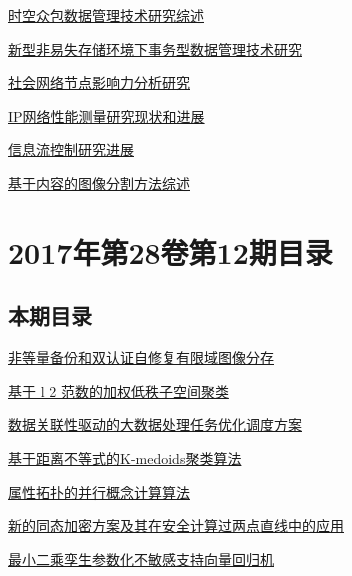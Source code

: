 \documentclass[a4paper]{article}
\begin{document}
\href{http://www.jos.org.cn/ch/reader/create_pdf.aspx?file_no=5140&year_id=2017&quarter_id=1&falg=1}{时空众包数据管理技术研究综述}

\href{http://www.jos.org.cn/ch/reader/create_pdf.aspx?file_no=5141&year_id=2017&quarter_id=1&falg=1}{新型非易失存储环境下事务型数据管理技术研究}

\href{http://www.jos.org.cn/ch/reader/create_pdf.aspx?file_no=5115&year_id=2017&quarter_id=1&falg=1}{社会网络节点影响力分析研究}

\href{http://www.jos.org.cn/ch/reader/create_pdf.aspx?file_no=5127&year_id=2017&quarter_id=1&falg=1}{IP网络性能测量研究现状和进展}

\href{http://www.jos.org.cn/ch/reader/create_pdf.aspx?file_no=5131&year_id=2017&quarter_id=1&falg=1}{信息流控制研究进展}

\href{http://www.jos.org.cn/ch/reader/create_pdf.aspx?file_no=5136&year_id=2017&quarter_id=1&falg=1}{基于内容的图像分割方法综述}


\section{\textbf{2017年第28卷第12期目录}}
\subsection{本期目录}
\href{http://www.jos.org.cn/ch/reader/create_pdf.aspx?file_no=5234&year_id=2017&quarter_id=12&falg=1}{非等量备份和双认证自修复有限域图像分存}

\href{http://www.jos.org.cn/ch/reader/create_pdf.aspx?file_no=5235&year_id=2017&quarter_id=12&falg=1}{基于 l 2 范数的加权低秩子空间聚类}

\href{http://www.jos.org.cn/ch/reader/create_pdf.aspx?file_no=5236&year_id=2017&quarter_id=12&falg=1}{数据关联性驱动的大数据处理任务优化调度方案}

\href{http://www.jos.org.cn/ch/reader/create_pdf.aspx?file_no=5237&year_id=2017&quarter_id=12&falg=1}{基于距离不等式的K-medoids聚类算法}

\href{http://www.jos.org.cn/ch/reader/create_pdf.aspx?file_no=5238&year_id=2017&quarter_id=12&falg=1}{属性拓扑的并行概念计算算法}

\href{http://www.jos.org.cn/ch/reader/create_pdf.aspx?file_no=5239&year_id=2017&quarter_id=12&falg=1}{新的同态加密方案及其在安全计算过两点直线中的应用}

\href{http://www.jos.org.cn/ch/reader/create_pdf.aspx?file_no=5240&year_id=2017&quarter_id=12&falg=1}{最小二乘孪生参数化不敏感支持向量回归机}
\end{document}
